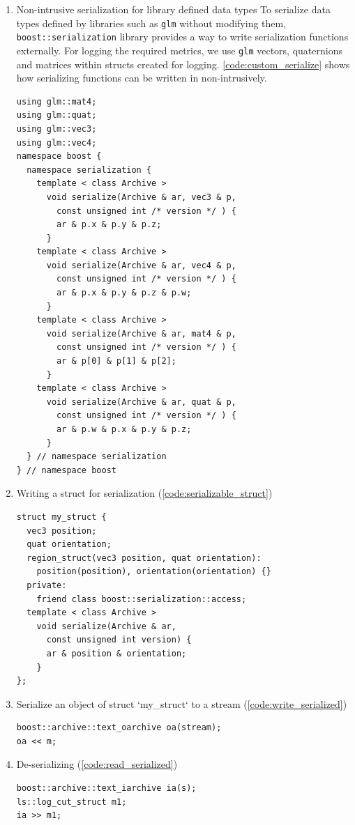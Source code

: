 \begin{enumerate}
    \item Non-intrusive serialization for library defined data types
    To serialize data types defined by libraries such as \texttt{glm} without modifying them, \texttt{boost::serialization} library provides a way to write serialization functions externally. For logging the required metrics, we use \texttt{glm} vectors, quaternions and matrices within structs created for logging. \autoref{code:custom_serialize} shows how serializing functions can be written in non-intrusively.
    \begin{lstlisting}[style=CStyle, caption={Serializing custom data types},label={code:custom_serialize}]
using glm::mat4;
using glm::quat;
using glm::vec3;
using glm::vec4;
namespace boost {
  namespace serialization {
    template < class Archive >
      void serialize(Archive & ar, vec3 & p,
        const unsigned int /* version */ ) {
        ar & p.x & p.y & p.z;
      }
    template < class Archive >
      void serialize(Archive & ar, vec4 & p,
        const unsigned int /* version */ ) {
        ar & p.x & p.y & p.z & p.w;
      }
    template < class Archive >
      void serialize(Archive & ar, mat4 & p,
        const unsigned int /* version */ ) {
        ar & p[0] & p[1] & p[2];
      }
    template < class Archive >
      void serialize(Archive & ar, quat & p,
        const unsigned int /* version */ ) {
        ar & p.w & p.x & p.y & p.z;
      }
  } // namespace serialization
} // namespace boost
    \end{lstlisting}
    \item Writing a struct for serialization (\autoref{code:serializable_struct})
    \begin{lstlisting}[style=CStyle, caption={A struct with serialize function written within it.},label={code:serializable_struct}]
struct my_struct {
  vec3 position;
  quat orientation;
  region_struct(vec3 position, quat orientation):
    position(position), orientation(orientation) {}
  private:
    friend class boost::serialization::access;
  template < class Archive >
    void serialize(Archive & ar,
      const unsigned int version) {
      ar & position & orientation;
    }
};
    \end{lstlisting}
    \item Serialize an object of struct `my\_struct` to a stream (\autoref{code:write_serialized})
    \begin{lstlisting}[style=CStyle, caption={Writing struct to a stream}, label={code:write_serialized}]
boost::archive::text_oarchive oa(stream);
oa << m;
    \end{lstlisting}
    \item De-serializing (\autoref{code:read_serialized})
    \begin{lstlisting}[style=CStyle, caption={Reading/De-serializing struct from a stream},label={code:read_serialized}]
boost::archive::text_iarchive ia(s);
ls::log_cut_struct m1;
ia >> m1;
    \end{lstlisting}
\end{enumerate}

